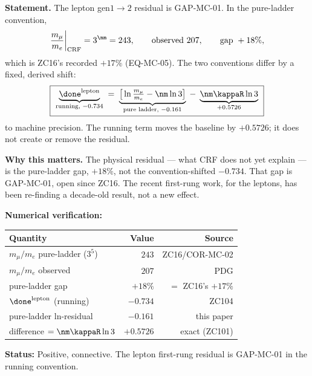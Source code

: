 \documentclass[12pt, a4paper]{article}
\begin{document}
\begin{formalbox}[title={FIND-ZC106-01: lepton first-rung residual $=$ GAP-MC-01 ($R_1$, numerical)}]

\textbf{Statement.} The lepton gen$1{\to}2$ residual is GAP-MC-01. In the
pure-ladder convention,
\[
  \frac{m_\mu}{m_e}\bigg|_{\rm CRF} = 3^{\nm}=243,
  \qquad \text{observed } 207,
  \qquad \text{gap } +18\%,
\]
which is ZC16's recorded $+17\%$ (EQ-MC-05). The two conventions differ by a
fixed, derived shift:
\begin{equation}
  \boxed{\
  \underbrace{\done^{\rm lepton}}_{\text{running, }-0.734}
  \;=\;
  \underbrace{\big[\ln\tfrac{m_\mu}{m_e}-\nm\ln 3\big]}_{\text{pure ladder, }-0.161}
  \;-\;
  \underbrace{\nm\kappaR\ln 3}_{+0.5726}
  \ }
  \label{eq:bridge-zc106}
\end{equation}
to machine precision. The running term moves the baseline by $+0.5726$; it does
not create or remove the residual.

\textbf{Why this matters.} The physical residual --- what CRF does not yet
explain --- is the pure-ladder gap, $+18\%$, not the convention-shifted $-0.734$.
That gap is GAP-MC-01, open since ZC16. The recent first-rung work, for the
leptons, has been re-finding a decade-old result, not a new effect.

\textbf{Numerical verification:}
\begin{center}
{\small\renewcommand{\arraystretch}{1.25}
\begin{tabular}{@{}lrr@{}}
\toprule
Quantity & Value & Source \\
\midrule
$m_\mu/m_e$ pure-ladder ($3^5$)      & $243$    & ZC16/COR-MC-02 \\
$m_\mu/m_e$ observed                  & $207$    & PDG \\
pure-ladder gap                       & $+18\%$  & $=$ ZC16's $+17\%$ \\
$\done^{\rm lepton}$ (running)        & $-0.734$ & ZC104 \\
pure-ladder ln-residual               & $-0.161$ & this paper \\
difference $=\nm\kappaR\ln 3$         & $+0.5726$ & exact (ZC101) \\
\bottomrule
\end{tabular}}
\end{center}

\textbf{Status:} Positive, connective. The lepton first-rung residual is
GAP-MC-01 in the running convention.
\end{formalbox}
\end{document}
